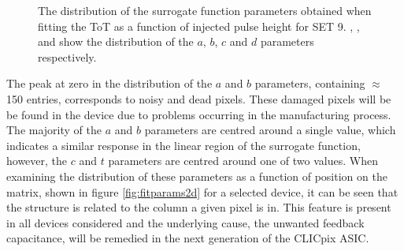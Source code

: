 \begin{figure}[h!]
\caption[The distribution of the surrogate function parameters obtained when fitting the ToT as a function of injected pulse height for SET 9.  \protect{}, \protect{}, \protect{} and \protect{} show the distribution of the $a$, $b$, $c$ and $d$ parameters respectively.]{The distribution of the surrogate function parameters obtained when fitting the ToT as a function of injected pulse height for SET 9.  \protect{}, \protect{}, \protect{} and \protect{} show the distribution of the $a$, $b$, $c$ and $d$ parameters respectively.}  
\label{fig:fitparams}
\end{figure}

The peak at zero in the distribution of the $a$ and $b$ parameters, containing $\approx$ 150 entries, corresponds to noisy and dead pixels.  These damaged pixels will be be found in the device due to problems occurring in the manufacturing process.  The majority of the $a$ and $b$ parameters are centred around a single value, which indicates a similar response in the linear region of the surrogate function, however, the $c$ and $t$ parameters are centred around one of two values.  When examining the distribution of these parameters as a function of position on the matrix, shown in figure \ref{fig:fitparams2d} for a selected device, it can be seen that the structure is related to the column a given pixel is in.  This feature is present in all devices considered and the underlying cause, the unwanted feedback capacitance, will be remedied in the next generation of the CLICpix ASIC.

